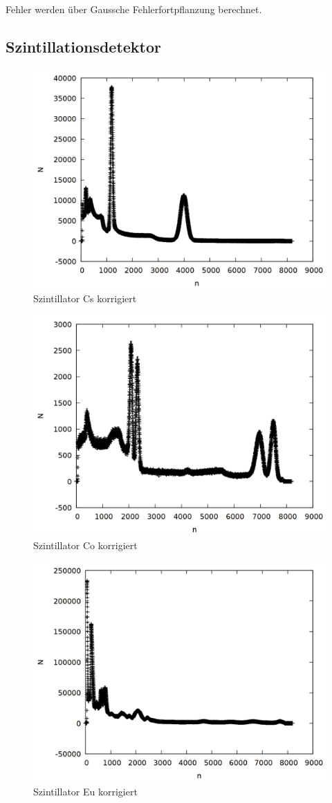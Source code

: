 Fehler werden über Gaussche Fehlerfortpflanzung berechnet.

\subsection{Szintillationsdetektor}
\begin{figure}
\centering
\includegraphics[width=0.7\linewidth]{data/si_cs.png}
\caption{Szintillator Cs korrigiert}
\label{fig:si_cs}
\end{figure}

\begin{figure}
\centering
\includegraphics[width=0.7\linewidth]{data/si_co.png}
\caption{Szintillator Co korrigiert}
\label{fig:si_co}
\end{figure}

\begin{figure}
\centering
\includegraphics[width=0.7\linewidth]{data/si_eu.png}
\caption{Szintillator Eu korrigiert}
\label{fig:si_eu}
\end{figure}

